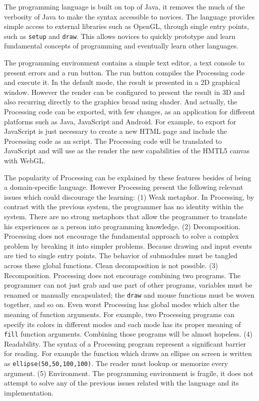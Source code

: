 The programming language is built on top of Java, it removes the much of the verbosity of Java to make the syntax accessible to novices. The language provides simple access to external libraries such as OpenGL, through single entry points, such as \texttt{setup} and \texttt{draw}. This allows novices to quickly prototype and learn fundamental concepts of programming and eventually learn other languages.

The programming environment contains a simple text editor, a text console to present errors and a run button. The run button compiles the Processing code and execute it. In the default mode, the result is presented in a 2D graphical window. However the render can be configured to present the result in 3D and also recurring directly to the graphics broad using shader. And actually, the Processing code can be exported, with few changes, as an application for different platforms such as Java, JavaScript and Android. For example, to export for JavaScript is just necessary to create a new HTML page and include the Processing code as an script. The Processing code will be translated to JavaScript and will use as the render the new capabilities of the HMTL5 canvas with WebGL.

The popularity of Processing can be explained by these features besides of being a domain-specific language. However Processing present the following relevant issues which could discourage the learning: (1) Weak metaphor. In Processing, by contrast with the previous system, the programmer has no identity within the system. There are no strong metaphors that allow the programmer to translate his experiences as a person into programming knowledge. (2) Decomposition. Processing does not encourage the fundamental approach to solve a complex problem by breaking it into simpler problems. Because drawing and input events are tied to single entry points. The behavior of submodules must be tangled across these global functions. Clean decomposition is not possible. (3) Recomposition. Processing does not encourage combining two programs. The programmer can not just grab and use part of other programs, variables must be renamed or manually encapsulated; the \texttt{draw} and mouse functions must be woven together, and so on. Even worst Processing has global modes which alter the meaning of function arguments. For example, two Processing programs can specify its colors in different modes and each mode has its proper meaning of \texttt{fill} function arguments. Combining those programs will be almost hopeless. (4) Readability. The syntax of a Processing program represent a significant barrier for reading. For example the function which draws an ellipse on screen is written as \texttt{ellipse(50,50,100,100)}. The reader must lookup or memorize every argument. (5) Environment. The programming environment is fragile, it does not attempt to solve any of the previous issues related with the language and its implementation. 
